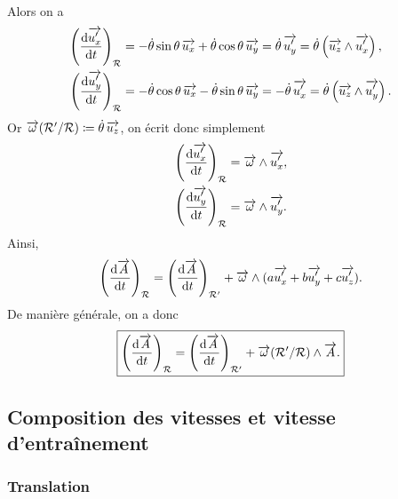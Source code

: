         Alors on a 
        \begin{equation*}
            \begin{aligned}
                \left(\frac{\rmd\vec{u_x'}}{\rmd t}\right)_{\calR} &= -\dot{\theta}\sin\theta\,\vec{u_x}+\dot{\theta}\cos\theta\,\vec{u_y}=\dot{\theta}\,\vec{u_y'}=\dot{\theta}\left(\vec{u_z}\wedge\vec{u_x'}\right),\\
                \left(\frac{\rmd\vec{u_y'}}{\rmd t}\right)_{\calR} &= -\dot{\theta}\cos\theta\,\vec{u_x}-\dot{\theta}\sin\theta\,\vec{u_y}=-\dot{\theta}\,\vec{u_x'}=\dot{\theta}\left(\vec{u_z}\wedge\vec{u_y'}\right).
            \end{aligned}
        \end{equation*}
        Or $\vec{\omega}(\calR'/\calR)\coloneqq\dot{\theta}\,\vec{u_z}$, on écrit donc simplement
        \begin{equation*}
            \begin{aligned}
                \left(\frac{\rmd\vec{u_x'}}{\rmd t}\right)_{\calR} &=\vec{\omega}\wedge\vec{u_x'},\\
                \left(\frac{\rmd\vec{u_y'}}{\rmd t}\right)_{\calR} &=\vec{\omega}\wedge\vec{u_y'}.
            \end{aligned}
        \end{equation*}
        Ainsi,
        \begin{equation*}
            \left(\frac{\rmd\vec{A}}{\rmd t}\right)_{\calR}=\left(\frac{\rmd\vec{A}}{\rmd t}\right)_{\calR'}+\vec{\omega}\wedge(a\vec{u_x'}+b\vec{u_y'}+c\vec{u_z'}).
        \end{equation*}
        De manière générale, on a donc 
        \begin{equation*}
            \boxed{
                \left(\frac{\rmd\vec{A}}{\rmd t}\right)_{\calR}=\left(\frac{\rmd\vec{A}}{\rmd t}\right)_{\calR'}+\vec{\omega}(\calR'/\calR)\wedge\vec{A}.
            }
        \end{equation*}
    
    \subsection{Composition des vitesses et vitesse d'entraînement}
        \subsubsection{Translation}

